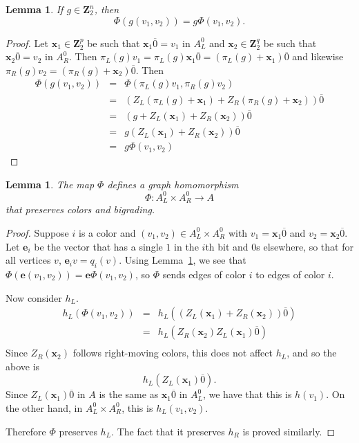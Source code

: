 \documentclass[12pt,twoside,singlespace]{article}
\numberwithin{equation}{section}
\newtheorem{lem}[equation]{Lemma}
\theoremstyle{definition}
\newcommand{\ZZ}{\mathbf{Z}}
\renewcommand{\vec}[1]{\mathbf{#1}}
\begin{document}
\begin{lem}
\label{lem:gphi}
If $g\in \ZZ_2^n$, then
\[\Phi(g(v_1,v_2))=g\Phi(v_1,v_2).\]
\end{lem}
\begin{proof}
Let $\vec{x}_1\in \ZZ_2^p$ be such that $\vec{x}_1\overline{0}=v_1$ in $A_L^0$ and $\vec{x}_2\in \ZZ_2^q$ be such that $\vec{x}_2\overline{0}=v_2$ in $A_R^0$.  Then $\pi_L(g)v_1 = \pi_L(g)\vec{x}_1\overline{0}=(\pi_L(g)+\vec{x}_1)\overline{0}$ and likewise $\pi_R(g)v_2=(\pi_R(g)+\vec{x}_2)\overline{0}$.  Then
\begin{eqnarray*}
\Phi(g(v_1,v_2))&=&\Phi(\pi_L(g)v_1,\pi_R(g)v_2)\\
&=&(Z_L(\pi_L(g)+\vec{x}_1)+Z_R(\pi_R(g)+\vec{x}_2))\overline{0}\\
&=&(g+Z_L(\vec{x}_1)+Z_R(\vec{x}_2))\overline{0}\\
&=&g(Z_L(\vec{x}_1)+Z_R(\vec{x}_2))\overline{0}\\
&=&g\Phi(v_1,v_2)
\end{eqnarray*}
\end{proof}


\begin{lem}
\label{lem:mainhomo}
The map $\Phi$ defines a graph homomorphism
\[\Phi:A_L^0\times A_R^0 \to A\]
that preserves colors and bigrading.
\end{lem}
\begin{proof}
Suppose $i$ is a color and $(v_1,v_2)\in A_L^0\times A_R^0$ with $v_1=\vec{x}_1\overline{0}$ and $v_2=\vec{x}_2\overline{0}$.  Let $\vec{e}_i$ be the vector that has a single $1$ in the $i$th bit and $0$s elsewhere, so that for all vertices $v$, $\vec{e}_i v=q_i(v)$.  Using Lemma~\ref{lem:gphi}, we see that $\Phi(\vec{e}(v_1,v_2))=\vec{e}\Phi(v_1,v_2)$, so $\Phi$ sends edges of color $i$ to edges of color $i$.

Now consider $h_L$.
\begin{eqnarray*}
h_L(\Phi(v_1,v_2)) &=& h_L((Z_L(\vec{x}_1)+Z_R(\vec{x}_2))\overline{0})\\
 &=& h_L(Z_R(\vec{x}_2)Z_L(\vec{x}_1)\overline{0})\\
\end{eqnarray*}
Since $Z_R(\vec{x}_2)$ follows right-moving colors, this does not affect $h_L$, and so the above is
\[h_L(Z_L(\vec{x}_1)\overline{0}).\]
Since $Z_L(\vec{x}_1)\overline{0}$ in $A$ is the same as $\vec{x}_1\overline{0}$ in $A_L^0$, we have that this is $h(v_1)$.  On the other hand, in $A_L^0\times A_R^0$, this is $h_L(v_1,v_2)$.

Therefore $\Phi$ preserves $h_L$.  The fact that it preserves $h_R$ is proved similarly.
\end{proof}
\end{document}
